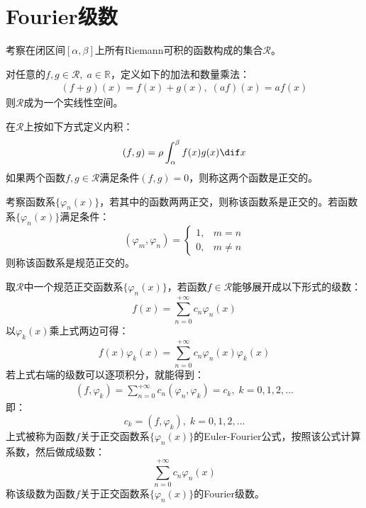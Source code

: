 \chapter{Fourier级数}

考察在闭区间$[\alpha,\beta]$上所有Riemann可积的函数构成的集合$\mathscr{R}$。\par
对任意的$f,g\in\mathscr{R},\;a\in\mathbb{R}$，定义如下的加法和数量乘法：
\begin{gather*}
	(f+g)(x)=f(x)+g(x),\;(af)(x)=af(x)
\end{gather*}
则$\mathscr{R}$成为一个实线性空间。\par
在$\mathscr{R}$上按如下方式定义内积：
\begin{equation*}
	(f,g)=\rho\int_{\alpha}^{\beta}f(x)g(x)\dif x
\end{equation*}
如果两个函数$f,g\in\mathscr{R}$满足条件$(f,g)=0$，则称这两个函数是正交的。\par
考察函数系$\{\varphi_n(x)\}$，若其中的函数两两正交，则称该函数系是正交的。若函数系$\{\varphi_n(x)\}$满足条件：
\begin{equation*}
	(\varphi_m,\varphi_n)=
	\begin{cases}
		1,&m=n \\
		0,&m\ne n
	\end{cases}
\end{equation*}
则称该函数系是规范正交的。\par
取$\mathscr{R}$中一个规范正交函数系$\{\varphi_n(x)\}$，若函数$f\in\mathscr{R}$能够展开成以下形式的级数：
\begin{equation*}
	f(x)=\sum_{n=0}^{+\infty}c_n\varphi_n(x)
\end{equation*}
以$\varphi_k(x)$乘上式两边可得：
\begin{equation*}
	f(x)\varphi_k(x)=\sum_{n=0}^{+\infty}c_n\varphi_n(x)\varphi_k(x)
\end{equation*}
若上式右端的级数可以逐项积分，就能得到：
\begin{align*}
	(f,\varphi_k)
	=\sum_{n=0}^{+\infty}c_n(\varphi_n,\varphi_k)
	=c_k,\;k=0,1,2,\dots
\end{align*}
即：
\begin{equation*}
	c_k=(f,\varphi_k),\;k=0,1,2,\dots
\end{equation*}
上式被称为函数$f$关于正交函数系$\{\varphi_n(x)\}$的Euler-Fourier公式，按照该公式计算系数，然后做成级数：
\begin{equation*}
	\sum_{n=0}^{+\infty}c_n\varphi_n(x)
\end{equation*}
称该级数为函数$f$关于正交函数系$\{\varphi_n(x)\}$的Fourier级数。

